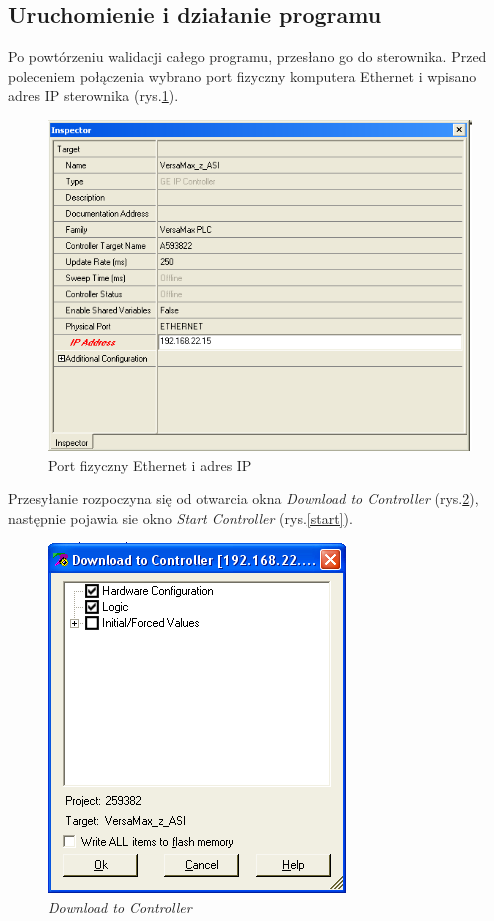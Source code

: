 \documentclass[12pt]{article}
\begin{document}
\subsection{Uruchomienie i działanie programu}
Po powtórzeniu walidacji całego programu, przesłano go do sterownika. Przed poleceniem połączenia wybrano port fizyczny komputera Ethernet i wpisano adres IP sterownika (rys.\ref{inspector}).
\begin{figure}[H]
    \centering
    \includegraphics[scale=0.7]{./zdj/inspector}
    \caption{Port fizyczny Ethernet i adres IP}
    \label{inspector}
\end{figure}
Przesyłanie rozpoczyna się od otwarcia okna \textit{Download to Controller} (rys.\ref{download}), następnie pojawia sie okno \textit{Start Controller} (rys.\ref{start}).
\begin{figure}[H]
    \centering
    \includegraphics[scale=0.75]{./zdj/download.png}
    \caption{\textit{Download to Controller}}
    \label{download}
\end{figure}
\end{document}

